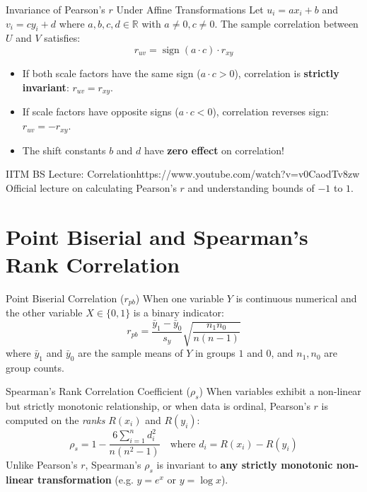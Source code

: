 \begin{theorembox}{Invariance of Pearson's $r$ Under Affine Transformations}
Let $u_i = a x_i + b$ and $v_i = c y_i + d$ where $a, b, c, d \in \mathbb{R}$ with $a \neq 0, c \neq 0$.
The sample correlation between $U$ and $V$ satisfies:
$$r_{uv} = \operatorname{sign}(a \cdot c) \cdot r_{xy}$$
\begin{itemize}
    \item If both scale factors have the same sign ($a \cdot c > 0$), correlation is \textbf{strictly invariant}: $r_{uv} = r_{xy}$.
    \item If scale factors have opposite signs ($a \cdot c < 0$), correlation reverses sign: $r_{uv} = -r_{xy}$.
    \item The shift constants $b$ and $d$ have \textbf{zero effect} on correlation!
\end{itemize}
\end{theorembox}

\begin{videocard}{IITM BS Lecture: Correlation}{https://www.youtube.com/watch?v=v0CaodTv8zw}
Official lecture on calculating Pearson's $r$ and understanding bounds of $-1$ to $1$.
\end{videocard}

\section{Point Biserial and Spearman's Rank Correlation}

\begin{definitionbox}{Point Biserial Correlation ($r_{pb}$)}
When one variable $Y$ is continuous numerical and the other variable $X \in \{0, 1\}$ is a binary indicator:
$$r_{pb} = \frac{\bar{y}_1 - \bar{y}_0}{s_y} \sqrt{\frac{n_1 n_0}{n(n-1)}}$$
where $\bar{y}_1$ and $\bar{y}_0$ are the sample means of $Y$ in groups $1$ and $0$, and $n_1, n_0$ are group counts.
\end{definitionbox}

\begin{definitionbox}{Spearman's Rank Correlation Coefficient ($\rho_s$)}
When variables exhibit a non-linear but strictly monotonic relationship, or when data is ordinal, Pearson's $r$ is computed on the \emph{ranks} $R(x_i)$ and $R(y_i)$:
$$\rho_s = 1 - \frac{6 \sum_{i=1}^n d_i^2}{n(n^2 - 1)} \quad \text{where } d_i = R(x_i) - R(y_i)$$
Unlike Pearson's $r$, Spearman's $\rho_s$ is invariant to \textbf{any strictly monotonic non-linear transformation} (e.g. $y = e^x$ or $y = \log x$).
\end{definitionbox}

